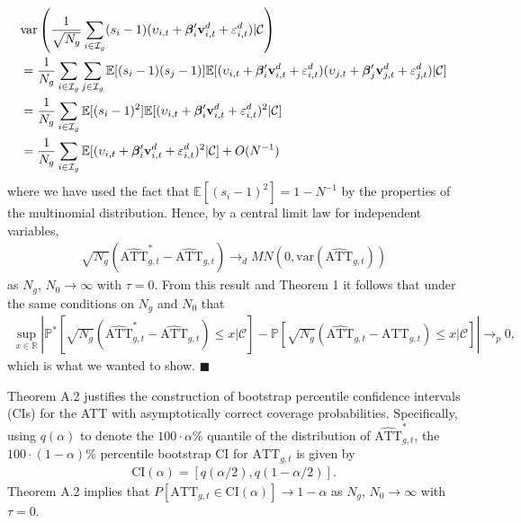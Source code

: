 \documentclass[12pt,fleqn]{article}
\begin{document}
\begin{align}
& \mathrm{var}\left(\frac{1}{\sqrt{N_g}}\sum_{i\in \mathcal{I}_g} (s_i-1)(\upsilon_{i,t}  + \boldsymbol{\beta}_i'\mathbf{v}_{i,t}^{d} + \varepsilon_{i,t}^{d})|\mathcal{C}\right) \notag\\
& = \frac{1}{N_g}\sum_{i\in \mathcal{I}_g}\sum_{j\in \mathcal{I}_g}\mathbb{E}[ (s_i-1)(s_j-1)]\mathbb{E}[(\upsilon_{i,t}  + \boldsymbol{\beta}_i'\mathbf{v}_{i,t}^{d} + \varepsilon_{i,t}^{d})(\upsilon_{j,t}  + \boldsymbol{\beta}_j'\mathbf{v}_{j,t}^{d} + \varepsilon_{j,t}^{d})|\mathcal{C}] \notag\\
& = \frac{1}{N_g}\sum_{i\in \mathcal{I}_g} \mathbb{E}[ (s_i-1)^2 ]\mathbb{E}[(\upsilon_{i,t}  + \boldsymbol{\beta}_i'\mathbf{v}_{i,t}^{d} + \varepsilon_{i,t}^{d})^2|\mathcal{C}]\notag\\
& = \frac{1}{N_g}\sum_{i\in \mathcal{I}_g} \mathbb{E}[(\upsilon_{i,t}  + \boldsymbol{\beta}_i'\mathbf{v}_{i,t}^{d} + \varepsilon_{i,t}^{d})^2|\mathcal{C}] + O(N^{-1})
\end{align}
where we have used the fact that $\mathbb{E}[ (s_i-1)^2 ] = 1-N^{-1}$ by the properties of the multinomial distribution. Hence, by a central limit law for independent variables,
\begin{align}
\sqrt{N_g}(\widehat{\mathrm{ATT}}_{g,t}^* - \widehat{\mathrm{ATT}}_{g,t}) \to_d MN(0, \mathrm{var}(\widehat{\mathrm{ATT}}_{g,t}) )
\end{align}
as $N_g,\,N_0\to \infty$ with $\tau =  0$. From this result and Theorem 1 it follows that under the same conditions on $N_g$ and $N_0$ that
\begin{eqnarray*}
\sup_{x \in \mathbb{R}} \left|\mathbb{P}^*[\sqrt{N_g}(\widehat{\mathrm{ATT}}_{g,t}^* - \widehat{\mathrm{ATT}}_{g,t}) \leq x|\mathcal{C}] - \mathbb{P}[\sqrt{N_g}(\widehat{\mathrm{ATT}}_{g,t} - \mathrm{ATT}_{g,t})\leq x|\mathcal{C}]\right| \to_p 0,
\end{eqnarray*}
which is what we wanted to show. \hfill{$\blacksquare$}

\bigskip

Theorem A.2 justifies the construction of bootstrap percentile confidence intervals (CIs) for the ATT with asymptotically correct coverage probabilities. Specifically, using $q(\alpha)$ to denote the $100\cdot \alpha$\% quantile of the distribution of $\widehat{\mathrm{ATT}}_{g,t}^*$, the $100\cdot (1-\alpha)$\% percentile bootstrap CI for $\mathrm{ATT}_{g,t}$ is given by
\begin{eqnarray}
\text{CI}(\alpha) = [q(\alpha/2),q(1-\alpha/2)].
\end{eqnarray}
Theorem A.2 implies that $P[\mathrm{ATT}_{g,t} \in \text{CI}(\alpha)] \to 1-\alpha$ as $N_g,\,N_0\to \infty$ with $\tau =  0$.
\end{document}
